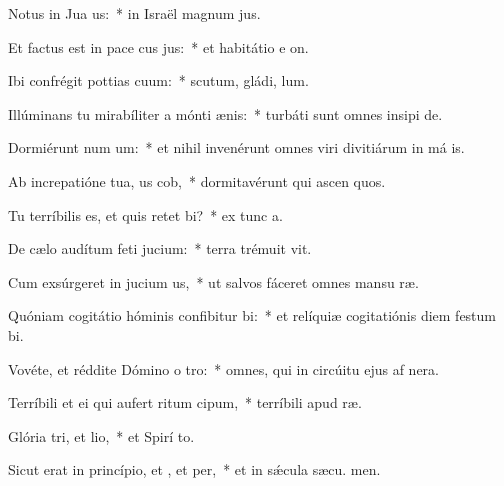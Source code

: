 \item Notus in Jua us:~* in Israël magnum  jus.
\item Et factus est in pace cus jus:~* et habitátio e  on.
\item Ibi confrégit pottias cuum:~* scutum, gládi,  lum.
\item Illúminans tu mirabíliter a mónti ænis:~* turbáti sunt omnes insipi de.
\item Dormiérunt num um:~* et nihil invenérunt omnes viri divitiárum in má is.
\item Ab increpatióne tua, us cob,~* dormitavérunt qui ascen quos.
\item Tu terríbilis es, et quis retet bi?~* ex tunc  a.
\item De cælo audítum feti jucium:~* terra trémuit  vit.
\item Cum exsúrgeret in jucium us,~* ut salvos fáceret omnes mansu ræ.
\item Quóniam cogitátio hóminis confibitur bi:~* et relíquiæ cogitatiónis diem festum  bi.
\item Vovéte, et réddite Dómino o tro:~* omnes, qui in circúitu ejus af nera.
\item Terríbili et ei qui aufert ritum cipum,~* terríbili apud  ræ.
\item Glória tri, et lio,~* et Spirí to.
\item Sicut erat in princípio, et , et per,~* et in sǽcula sæcu. men.
